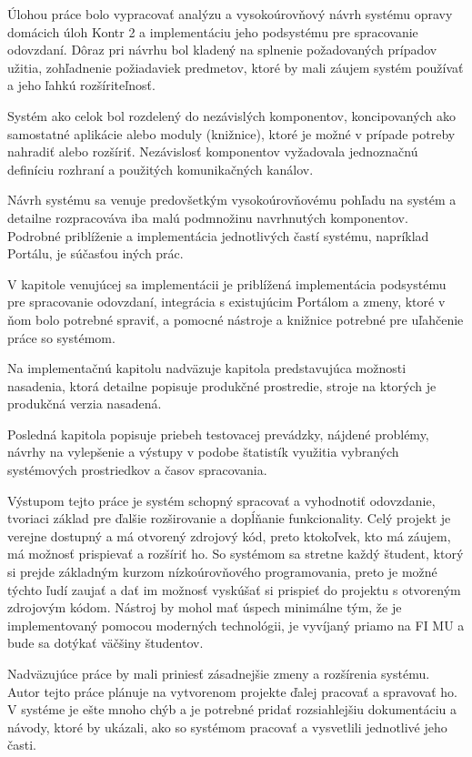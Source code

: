 \documentclass[
  digital, %
  oneside, %
  table,   %
  lof,     %
  lot,   %
]{fithesis3}
\begin{document}
Úlohou práce bolo vypracovať analýzu a vysokoúrovňový návrh systému opravy domácich úloh Kontr 2 a implementáciu jeho podsystému pre spracovanie odovzdaní. 
Dôraz pri návrhu bol kladený na splnenie požadovaných prípadov užitia, zohľadnenie požiadaviek predmetov, ktoré by mali záujem systém používať a jeho ľahkú rozšíriteľnosť.

Systém ako celok bol rozdelený do nezávislých komponentov, koncipovaných ako samostatné aplikácie alebo moduly (knižnice), ktoré je možné v prípade potreby nahradiť alebo rozšíriť. Nezávislosť komponentov vyžadovala jednoznačnú definíciu rozhraní a použitých komunikačných kanálov.

Návrh systému sa venuje predovšetkým vysokoúrovňovému pohľadu na systém a detailne rozpracováva iba malú podmnožinu navrhnutých komponentov. Podrobné priblíženie a implementácia jednotlivých častí systému, napríklad Portálu, je súčasťou iných prác.

V kapitole venujúcej sa implementácii je priblížená implementácia podsystému pre spracovanie odovzdaní, integrácia s existujúcim Portálom a zmeny, ktoré v ňom bolo potrebné spraviť, a pomocné nástroje a knižnice potrebné pre uľahčenie práce so systémom.

Na implementačnú kapitolu nadväzuje kapitola predstavujúca možnosti nasadenia, ktorá detailne popisuje produkčné prostredie, stroje na ktorých je produkčná verzia nasadená. 

Posledná kapitola popisuje priebeh testovacej prevádzky, nájdené problémy, návrhy na vylepšenie a výstupy v podobe štatistík využitia vybraných systémových prostriedkov a časov spracovania.

Výstupom tejto práce je systém schopný spracovať a vyhodnotiť odovzdanie, tvoriaci základ pre ďalšie rozširovanie a dopĺňanie funkcionality. Celý projekt je verejne dostupný a má otvorený zdrojový kód, preto ktokoľvek, kto má záujem, má možnosť prispievať a rozšíriť ho. So systémom sa stretne každý študent, ktorý si prejde základným kurzom nízkoúrovňového programovania, preto je možné týchto ľudí zaujať a dať im možnosť vyskúšať si prispieť do projektu s otvoreným zdrojovým kódom. 
Nástroj by mohol mať úspech minimálne tým, že je implementovaný pomocou moderných technológii, je vyvíjaný priamo na FI MU a bude sa dotýkať väčšiny študentov.

Nadväzujúce práce by mali priniesť zásadnejšie zmeny a rozšírenia systému. Autor tejto práce plánuje na vytvorenom projekte ďalej pracovať a spravovať ho. V systéme je ešte mnoho chýb a je potrebné pridať rozsiahlejšiu dokumentáciu a návody, ktoré by ukázali, ako so systémom pracovať a vysvetlili jednotlivé jeho časti.
\end{document}
